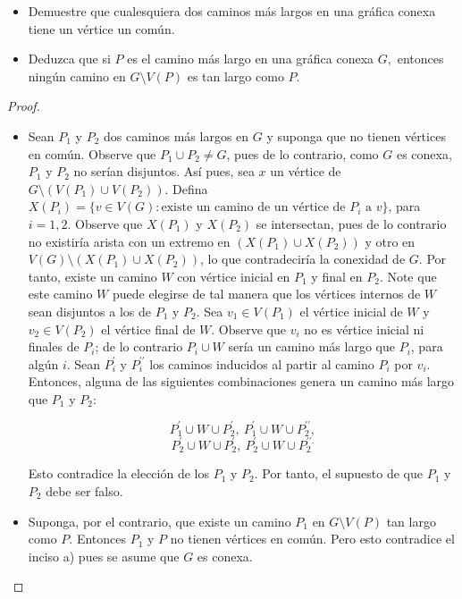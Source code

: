 \documentclass[12pt]{article}
\newenvironment{problem}[2][Problema]{\begin{trivlist}
\item[\hskip \labelsep {\bfseries #1}\hskip \labelsep {\bfseries #2.}]}{\end{trivlist}}
\begin{document}
\begin{problem}{2.2.13} \text{}
\begin{itemize}
    \item[a)] Demuestre que cualesquiera dos caminos más largos en una gráfica conexa tiene un vértice un común. 
    \item[b)] Deduzca que si $P$ es el camino más largo en una gráfica conexa $G,$ entonces ningún camino en $G \setminus V(P)$ es tan largo como $P.$
\end{itemize}
\end{problem}
\begin{proof}
\textbf{}
\begin{itemize}
    \item[a)] Sean $P_1$ y $P_2$ dos caminos más largos en $G$ y suponga que no tienen vértices en común. Observe que $P_1 \cup P_2 \neq G$, pues de lo contrario, como $G$ es conexa, $P_1$ y $P_2$ no serían disjuntos. Así pues, sea $x$ un vértice de $G \setminus (V(P_1) \cup V(P_2))$. Defina $X(P_i) = \{v \in V(G): \text{existe un camino de un vértice de } P_i \text{ a } v \}$, para $i=1,2.$ Observe que $X(P_1)$ y $X(P_2)$ se intersectan, pues de lo contrario no existiría arista con un extremo en $(X(P_1) \cup X(P_2))$  y otro en $V(G) \setminus (X(P_1) \cup X(P_2))$, lo que contradeciría la conexidad de $G.$ Por tanto, existe un camino $W$ con vértice inicial en $P_1$ y final en $P_2$. Note que este camino $W$ puede elegirse de tal manera que los vértices internos de $W$ sean disjuntos a los de $P_1$ y $P_2.$ Sea $v_1 \in V(P_1)$ el vértice inicial de $W$ y $v_2 \in V(P_2)$ el vértice final de $W.$ Observe que $v_i$ no es vértice inicial ni finales de $P_i$; de lo contrario $P_i \cup W$ sería un camino más largo que $P_i$, para algún $i.$ Sean $P_i^\prime$ y $P_i^{\prime \prime}$ los caminos inducidos al partir al camino $P_i$ por $v_i.$ Entonces, alguna de las siguientes combinaciones genera un camino más largo que $P_1$ y $P_2:$
    
    $$P_1^\prime \cup W \cup P_2^\prime, \ P_1^\prime \cup W \cup P_2^{\prime \prime },$$
    $$P_2^\prime \cup W \cup P_2^\prime, \ P_2^\prime \cup W \cup P_2^{\prime \prime.}$$
    
    Esto contradice la elección de los $P_1$ y $P_2$. Por tanto, el supuesto de que $P_1$ y $P_2$ debe ser falso.
    
    \item[b)] Suponga, por el contrario, que existe un camino $P_1$ en $G \setminus V(P)$ tan largo como $P.$ Entonces $P_1$ y $P$ no tienen vértices en común. Pero esto contradice el inciso a) pues se asume que $G$ es conexa. 
\end{itemize}
\end{proof}
\end{document}
